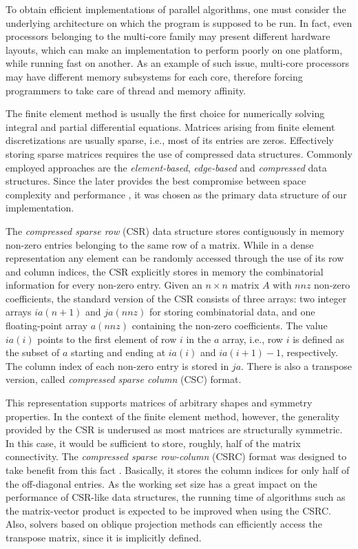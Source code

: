 \documentclass[11pt]{article}
\begin{document}
To obtain efficient implementations of parallel algorithms, one must consider
the underlying architecture on which the program is supposed to be run.  In
fact, even processors belonging to the multi-core family may present different
hardware layouts, which can make an implementation to perform poorly on one
platform, while running fast on another.  As an example of such issue,
multi-core processors may have different memory subsystems for each core, therefore
forcing programmers to take care of thread and memory affinity.

The finite element method is usually the first choice for numerically solving
integral and partial differential equations.  Matrices arising from finite
element discretizations are usually sparse, i.e., most of its entries are
zeros.  Effectively storing sparse matrices requires the use of compressed data
structures.  Commonly employed approaches are the \textit{element-based},
\textit{edge-based} and \textit{compressed} data
structures.  Since the later provides the best compromise between space
complexity and performance \cite{RC05a}, it was chosen as the primary data
structure of our implementation.

The \textit{compressed sparse row} (CSR) data structure stores contiguously in memory non-zero entries belonging
to the same row of a matrix.  While in a dense representation any
element can be randomly accessed through the use of its row and
column indices, the CSR explicitly stores in memory the combinatorial
information for every non-zero entry.  Given an $n \times n$ matrix $A$ with $nnz$
non-zero coefficients, the standard version of the CSR \cite{Saa95a} consists
of three arrays: two integer arrays $ia(n+1)$ and $ja(nnz)$ for storing
combinatorial data, and one floating-point array $a(nnz)$ containing the
non-zero coefficients. The value $ia(i)$ points to the first element of row $i$
in the $a$ array, i.e., row $i$ is defined as the subset of $a$ starting and
ending at $ia(i)$ and $ia(i+1)-1$, respectively.  The column index of each
non-zero entry is stored in $ja$.  There is also a transpose version,
called \textit{compressed sparse column} (CSC) format.

This representation supports matrices of arbitrary shapes and symmetry
properties.  In the context of the finite element method, however, the
generality provided by the CSR is underused as most matrices are structurally symmetric.
In this case, it would be sufficient to store, roughly, half
of the matrix connectivity. The \textit{compressed sparse row-column} (CSRC)
format was designed to take benefit from this fact \cite{RF07a}.  Basically, it
stores the column indices for only half of the off-diagonal entries.  As the
working set size has a great impact on the performance of CSR-like data
structures, the running time of algorithms such as the matrix-vector product is expected
to be improved when using the CSRC.  Also, solvers based on oblique projection methods can efficiently
access the transpose matrix, since it is implicitly defined.
\end{document}
